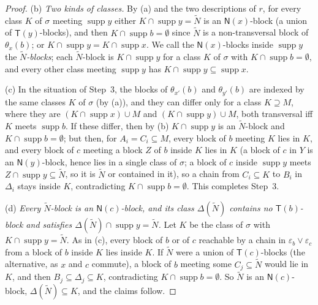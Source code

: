 \documentclass[11pt]{amsart}
\theoremstyle{definition}
\newcommand{\supp}{\operatorname{supp}}
\newcommand{\T}{\mathsf{T}}
\newcommand{\N}{\mathsf{N}}
\begin{document}
\begin{proof}
(b) \emph{Two kinds of classes.} By (a) and the two descriptions of $r$, for every class $K$ of $\sigma$ meeting $\supp y$ either $K\cap\supp y=\tilde N$ is an $\N(x)$-block (a union of $\T(y)$-blocks), and then $K\cap\supp b=\emptyset$ since $\tilde N$ is a non-transversal block of $\theta_x(b)$; or $K\cap\supp y=K\cap\supp x$. We call the $\N(x)$-blocks inside $\supp y$ the \emph{$\tilde N$-blocks}; each $\tilde N$-block is $K\cap\supp y$ for a class $K$ of $\sigma$ with $K\cap\supp b=\emptyset$, and every other class meeting $\supp y$ has $K\cap\supp y\subseteq\supp x$.

(c) In the situation of Step~3, the blocks of $\theta_{x'}(b)$ and $\theta_{y'}(b)$ are indexed by the same classes $K$ of $\sigma$ (by (a)), and they can differ only for a class $K\supseteq M$, where they are $(K\cap\supp x)\cup M$ and $(K\cap\supp y)\cup M$, both transversal iff $K$ meets $\supp b$. If these differ, then by (b) $K\cap\supp y$ is an $\tilde N$-block and $K\cap\supp b=\emptyset$; but then, for $A_i=C_i\subseteq M$, every block of $b$ meeting $K$ lies in $K$, and every block of $c$ meeting a block $Z$ of $b$ inside $K$ lies in $K$ (a block of $c$ in $Y$ is an $\N(y)$-block, hence lies in a single class of $\sigma$; a block of $c$ inside $\supp y$ meets $Z\cap\supp y\subseteq\tilde N$, so it is $\tilde N$ or contained in it), so a chain from $C_i\subseteq K$ to $B_i$ in $\Delta_i$ stays inside $K$, contradicting $K\cap\supp b=\emptyset$. This completes Step~3.

(d) \emph{Every $\tilde N$-block is an $\N(c)$-block, and its class $\Delta(\tilde N)$ contains no $\T(b)$-block and satisfies $\Delta(\tilde N)\cap\supp y=\tilde N$.} Let $K$ be the class of $\sigma$ with $K\cap\supp y=\tilde N$. As in (c), every block of $b$ or of $c$ reachable by a chain in $\varepsilon_b\vee\varepsilon_c$ from a block of $b$ inside $K$ lies inside $K$. If $\tilde N$ were a union of $\T(c)$-blocks (the alternative, as $x$ and $c$ commute), a block of $b$ meeting some $C_j\subseteq\tilde N$ would lie in $K$, and then $B_j\subseteq\Delta_j\subseteq K$, contradicting $K\cap\supp b=\emptyset$. So $\tilde N$ is an $\N(c)$-block, $\Delta(\tilde N)\subseteq K$, and the claims follow.


\end{proof}
\end{document}

